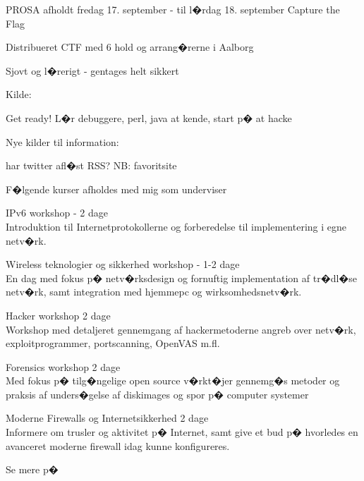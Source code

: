 \documentclass[20pt,landscape,a4paper,footrule]{foils}
\begin{document}


\begin{list1}
\item PROSA afholdt fredag 17. september - til l�rdag 18. september Capture the Flag
\item Distribueret CTF med 6 hold og arrang�rerne i Aalborg
\item Sjovt og l�rerigt - gentages helt sikkert
\end{list1}
Kilde: 

\centerline{Get ready! L�r debuggere, perl, java at kende, start p� at hacke}




\myquestionspage







\begin{list1}
\item Nye kilder til information:
\item har twitter afl�st RSS? NB: favoritsite 
\end{list1}





\hlkprofil


\begin{list1}
\item F�lgende kurser afholdes med mig som underviser
\begin{list2}
\item IPv6 workshop - 2 dage\\
 Introduktion til Internetprotokollerne og forberedelse til
  implementering i egne netv�rk.
\item Wireless teknologier og sikkerhed workshop - 1-2 dage\\
En dag med fokus p� netv�rksdesign og fornuftig implementation af
tr�dl�se netv�rk, samt integration med hjemmepc og
wirksomhedsnetv�rk.
\item Hacker workshop 2 dage\\
Workshop med detaljeret gennemgang af hackermetoderne angreb over
netv�rk, exploitprogrammer, portscanning, OpenVAS m.fl.
\item Forensics workshop 2 dage\\
Med fokus p� tilg�ngelige open source v�rkt�jer gennemg�s metoder og
praksis af unders�gelse af diskimages og spor p� computer systemer
\item Moderne Firewalls og Internetsikkerhed 2 dage\\
Informere om trusler og aktivitet p� Internet, samt give et bud
p� hvorledes en avanceret moderne firewall idag kunne konfigureres.
\end{list2}
\end{list1}

Se mere p� 
\end{document}
